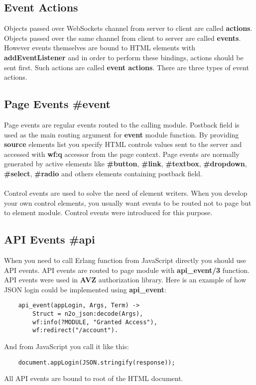 \subsection*{Event Actions}
Objects passed over WebSockets channel from server to client are called {\bf actions}.
Objects passed over the same channel from client to server are called {\bf events}. However
events themselves are bound to HTML elements with {\bf addEventListener} and in order to perform these bindings,
actions should be sent first. Such actions are called {\bf event actions}. There are three types of event actions.

\subsection{Page Events \#event}
Page events are regular events routed to the calling module. Postback field is used as the main
routing argument for {\bf event} module function. By providing {\bf source} elements list you specify
HTML controls values sent to the server and accessed with {\bf wf:q} accessor from the page context.
Page events are normally generated by active elements like {\bf \#button}, {\bf \#link},
{\bf \#textbox}, {\bf \#dropdown}, {\bf \#select}, {\bf \#radio} and others elements
containing postback field.

\paragraph{}
Control events are used to solve the need of element writers. When you develop your
own control elements, you usually want events to be routed not to page but to element module.
Control events were introduced for this purpose.

\subsection{API Events \#api}
When you need to call Erlang function from JavaScript directly you should use API events.
API events are routed to page module with {\bf api\_event/3} function. API events were
used in {\bf AVZ} authorization library. Here is an example of how JSON login could be
implemented using {\bf api\_event}:

\vspace{1\baselineskip}
\begin{lstlisting}
    api_event(appLogin, Args, Term) ->
        Struct = n2o_json:decode(Args),
        wf:info(?MODULE, "Granted Access"),
        wf:redirect("/account").
\end{lstlisting}
\vspace{1\baselineskip}
And from JavaScript you call it like this:
\vspace{1\baselineskip}
\begin{lstlisting}
    document.appLogin(JSON.stringify(response));
\end{lstlisting}
\vspace{1\baselineskip}
All API events are bound to root of the HTML document.


